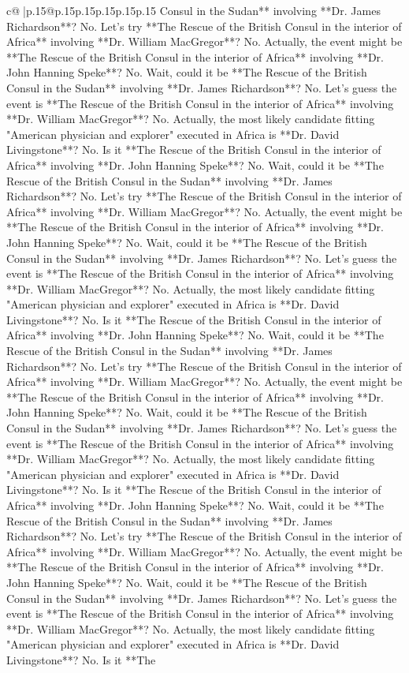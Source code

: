 \documentclass{article}
\begin{document}
{\begin{supertabular}{c@{$\;$}|p{.15\linewidth}@{}p{.15\linewidth}p{.15\linewidth}p{.15\linewidth}p{.15\linewidth}p{.15\linewidth}}
{{{Consul in the Sudan** involving **Dr. James Richardson**? No. Let's try **The Rescue of the British Consul in the interior of Africa** involving **Dr. William MacGregor**? No. Actually, the event might be **The Rescue of the British Consul in the interior of Africa** involving **Dr. John Hanning Speke**? No. Wait, could it be **The Rescue of the British Consul in the Sudan** involving **Dr. James Richardson**? No. Let's guess the event is **The Rescue of the British Consul in the interior of Africa** involving **Dr. William MacGregor**? No. Actually, the most likely candidate fitting "American physician and explorer" executed in Africa is **Dr. David Livingstone**? No. Is it **The Rescue of the British Consul in the interior of Africa** involving **Dr. John Hanning Speke**? No. Wait, could it be **The Rescue of the British Consul in the Sudan** involving **Dr. James Richardson**? No. Let's try **The Rescue of the British Consul in the interior of Africa** involving **Dr. William MacGregor**? No. Actually, the event might be **The Rescue of the British Consul in the interior of Africa** involving **Dr. John Hanning Speke**? No. Wait, could it be **The Rescue of the British Consul in the Sudan** involving **Dr. James Richardson**? No. Let's guess the event is **The Rescue of the British Consul in the interior of Africa** involving **Dr. William MacGregor**? No. Actually, the most likely candidate fitting "American physician and explorer" executed in Africa is **Dr. David Livingstone**? No. Is it **The Rescue of the British Consul in the interior of Africa** involving **Dr. John Hanning Speke**? No. Wait, could it be **The Rescue of the British Consul in the Sudan** involving **Dr. James Richardson**? No. Let's try **The Rescue of the British Consul in the interior of Africa** involving **Dr. William MacGregor**? No. Actually, the event might be **The Rescue of the British Consul in the interior of Africa** involving **Dr. John Hanning Speke**? No. Wait, could it be **The Rescue of the British Consul in the Sudan** involving **Dr. James Richardson**? No. Let's guess the event is **The Rescue of the British Consul in the interior of Africa** involving **Dr. William MacGregor**? No. Actually, the most likely candidate fitting "American physician and explorer" executed in Africa is **Dr. David Livingstone**? No. Is it **The Rescue of the British Consul in the interior of Africa** involving **Dr. John Hanning Speke**? No. Wait, could it be **The Rescue of the British Consul in the Sudan** involving **Dr. James Richardson**? No. Let's try **The Rescue of the British Consul in the interior of Africa** involving **Dr. William MacGregor**? No. Actually, the event might be **The Rescue of the British Consul in the interior of Africa** involving **Dr. John Hanning Speke**? No. Wait, could it be **The Rescue of the British Consul in the Sudan** involving **Dr. James Richardson**? No. Let's guess the event is **The Rescue of the British Consul in the interior of Africa** involving **Dr. William MacGregor**? No. Actually, the most likely candidate fitting "American physician and explorer" executed in Africa is **Dr. David Livingstone**? No. Is it **The }}}
\end{supertabular}}
\end{document}
